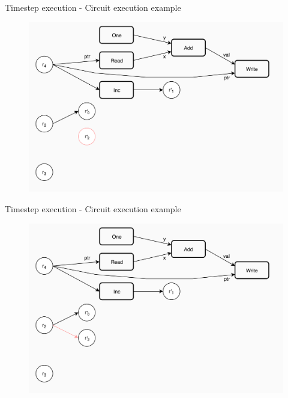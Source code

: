 \documentclass[xcolor={usenames}]{beamer}
\begin{document}
  \begin{frame}{Timestep execution - Circuit execution example}
  	\begin{figure}
  		\centering
  		\includegraphics[width=\textwidth]{../figures/example-circuit-16.png}
  	\end{figure}
  \end{frame}
  \begin{frame}{Timestep execution - Circuit execution example}
  	\begin{figure}
  		\centering
  		\includegraphics[width=\textwidth]{../figures/example-circuit-17.png}
  	\end{figure}
  \end{frame}
\end{document}
